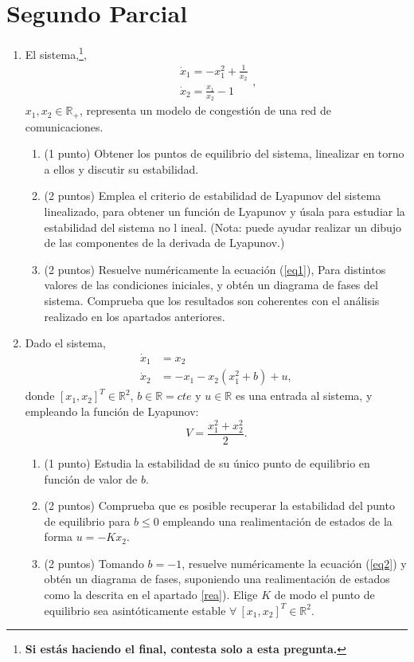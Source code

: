 \documentclass[10pt,a4paper]{article}
\begin{document}
\section{Segundo Parcial}
\begin{enumerate}
\item El sistema,\footnote{\textbf{Si estás haciendo el final, contesta solo a esta pregunta.}},
\begin{equation}\label{eq1}
\begin{split}
\dot x_1 = -x_1^2 + \frac{1}{x_2}\\
\dot x_2 = \frac{x_1}{x_2} -1
\end{split},
\end{equation}
$x_1,x_2 \in \mathbb{R_+}$, representa un modelo de congestión de una red de comunicaciones. 	
	\begin{enumerate}
	\item (1 punto) Obtener los puntos de equilibrio del sistema, 			linealizar en torno a ellos y discutir su estabilidad.
	\item \label{apb} (2 puntos)  Emplea el criterio de estabilidad 		de Lyapunov del sistema linealizado, para obtener un función de 		Lyapunov y úsala para  estudiar la estabilidad del sistema no 		l	ineal. (Nota: puede ayudar realizar un dibujo de las componentes 		de la derivada de Lyapunov.)
	\item (2 puntos) Resuelve numéricamente la ecuación (\ref{eq1}), 		Para distintos valores de las condiciones iniciales, y obtén un 		diagrama de fases del sistema. Comprueba que los resultados son 		coherentes con el análisis realizado en los apartados anteriores.
	\end{enumerate}
	

\item Dado el sistema,
\begin{equation}\label{eq2}
\begin{split}
\dot x_1 &= x_2\\
\dot x_2 &= -x_1 - x_2(x_1^2+b)+u,
\end{split}
\end{equation} donde $[x_1,x_2]^T \in \mathbb{R}^2$, $b \in \mathbb{R} = cte$ y $u \in \mathbb{R}$ es una entrada al sistema,  y empleando la función de Lyapunov:
\begin{equation}
V = \frac{x_1^2 + x_2^2}{2}.
\end{equation}
\begin{enumerate}
\item (1 punto) Estudia la estabilidad de su único punto de equilibrio en función de valor de $b$.
\item \label{rea}(2 puntos) Comprueba que es posible recuperar la estabilidad del punto de equilibrio para $b\leq 0$  empleando una realimentación de estados de la forma $u = -Kx_2$.
 
\item (2 puntos) Tomando $b=-1$, resuelve numéricamente la ecuación (\ref{eq2}) y obtén un diagrama de fases, suponiendo una realimentación de estados como la descrita en el apartado \ref{rea}). Elige $K$ de modo el punto de equilibrio sea asintóticamente estable $\forall \  [x_1,x_2]^T \in \mathbb{R}^2$. 
\end{enumerate}
\end{enumerate}
\end{document}
